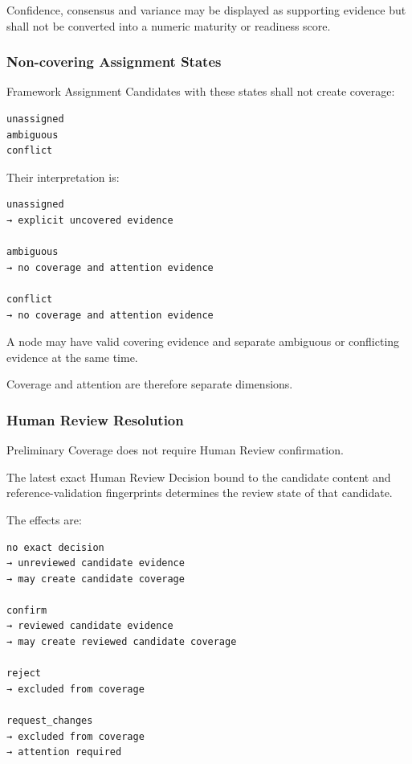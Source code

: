 Confidence, consensus and variance may be displayed as supporting evidence but shall not be converted into a numeric maturity or readiness score.

\hypertarget{non-covering-assignment-states}{%
\subsubsection{Non-covering Assignment States}\label{non-covering-assignment-states}}

Framework Assignment Candidates with these states shall not create coverage:

\begin{verbatim}
unassigned
ambiguous
conflict
\end{verbatim}

Their interpretation is:

\begin{verbatim}
unassigned
→ explicit uncovered evidence

ambiguous
→ no coverage and attention evidence

conflict
→ no coverage and attention evidence
\end{verbatim}

A node may have valid covering evidence and separate ambiguous or conflicting evidence at the same time.

Coverage and attention are therefore separate dimensions.

\hypertarget{human-review-resolution}{%
\subsubsection{Human Review Resolution}\label{human-review-resolution}}

Preliminary Coverage does not require Human Review confirmation.

The latest exact Human Review Decision bound to the candidate content and reference-validation fingerprints determines the review state of that candidate.

The effects are:

\begin{verbatim}
no exact decision
→ unreviewed candidate evidence
→ may create candidate coverage

confirm
→ reviewed candidate evidence
→ may create reviewed candidate coverage

reject
→ excluded from coverage

request_changes
→ excluded from coverage
→ attention required
\end{verbatim}

